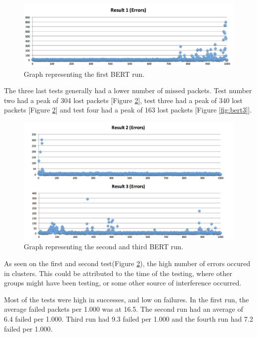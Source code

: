 \begin{figure}[h!]
\hspace*{-2cm}
\includegraphics[width=1.3\textwidth]{chapters/test/figures/res1.png}
\caption{Graph representing the first BERT run.}
\label{fig:bert1}
\end{figure}

The three last tests generally had a lower number of missed packets. Test number two had a peak of 304 lost packets [Figure \ref{fig:bert2}], test three had a peak of 340 lost packets [Figure \ref{fig:bert2}] and test four had a peak of 163 lost packets [Figure \ref{fig:bert3}].

\begin{figure}[h!]
\hspace*{-2cm}
\includegraphics[width=1.3\textwidth]{chapters/test/figures/res5.png}
\caption{Graph representing the second and third BERT run.}
\label{fig:bert2}
\end{figure}

As seen on the first and second test(Figure \ref{fig:bert2}), the high number of errors occured in clusters. This could be attributed to the time of the testing, where other groups might have been testing, or some other source of interference occurred.

Most of the tests were high in successes, and low on failures. In the first run, the average failed packets per 1.000 was at 16.5. The second run had an average of 6.4 failed per 1.000. Third run had 9.3 failed per 1.000 and the fourth run had 7.2 failed per 1.000.



